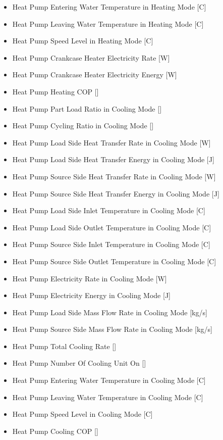 \begin{itemize}
\item Heat Pump Entering Water Temperature in Heating Mode {[}C{]}
\item Heat Pump Leaving Water Temperature in Heating Mode {[}C{]}
\item Heat Pump Speed Level in Heating Mode {[}C{]}
\item Heat Pump Crankcase Heater Electricity Rate {[}W{]}
\item Heat Pump Crankcase Heater Electricity Energy {[}W{]}
\item Heat Pump Heating COP {[}{]}
\item Heat Pump Part Load Ratio in Cooling Mode {[}{]}
\item Heat Pump Cycling Ratio in Cooling Mode {[}{]}
\item Heat Pump Load Side Heat Transfer Rate in Cooling Mode {[}W{]}
\item Heat Pump Load Side Heat Transfer Energy in Cooling Mode {[}J{]}
\item Heat Pump Source Side Heat Transfer Rate in Cooling Mode {[}W{]}
\item Heat Pump Source Side Heat Transfer Energy in Cooling Mode {[}J{]}
\item Heat Pump Load Side Inlet Temperature in Cooling Mode {[}C{]}
\item Heat Pump Load Side Outlet Temperature in Cooling Mode {[}C{]}
\item Heat Pump Source Side Inlet Temperature in Cooling Mode {[}C{]}
\item Heat Pump Source Side Outlet Temperature in Cooling Mode {[}C{]}
\item Heat Pump Electricity Rate in Cooling Mode {[}W{]}
\item Heat Pump Electricity Energy in Cooling Mode {[}J{]}
\item Heat Pump Load Side Mass Flow Rate in Cooling Mode {[}kg/s{]}
\item Heat Pump Source Side Mass Flow Rate in Cooling Mode {[}kg/s{]}
\item Heat Pump Total Cooling Rate {[}{]}
\item Heat Pump Number Of Cooling Unit On {[}{]}
\item Heat Pump Entering Water Temperature in Cooling Mode {[}C{]}
\item Heat Pump Leaving Water Temperature in Cooling Mode {[}C{]}
\item Heat Pump Speed Level in Cooling Mode {[}C{]}
\item Heat Pump Cooling COP {[}{]}
\end{itemize}
